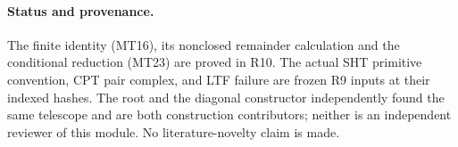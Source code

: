 \paragraph{Status and provenance.}
The finite identity (MT16), its nonclosed remainder calculation and
the conditional reduction (MT23) are proved in R10.  The actual SHT
primitive convention, CPT pair complex, and LTF failure are frozen
R9 inputs at their indexed hashes.  The root and the diagonal
constructor independently found the same telescope and are both
construction contributors; neither is an independent reviewer of
this module.  No literature-novelty claim is made.
